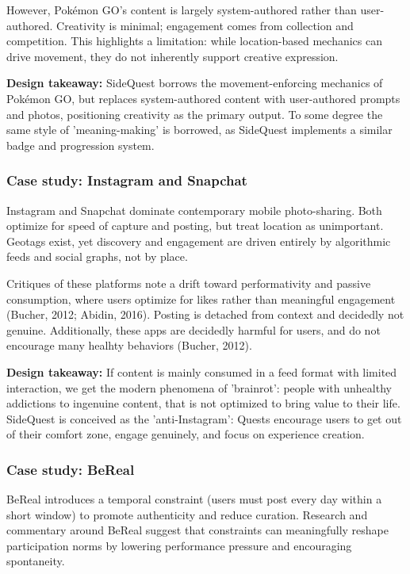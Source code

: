 \documentclass[12pt]{article}
\begin{document}
However, Pok\'emon GO's content is largely system-authored rather than user-authored. Creativity is minimal; engagement comes from collection and competition. This highlights a limitation: while location-based mechanics can drive movement, they do not inherently support creative expression.

\textbf{Design takeaway:} SideQuest borrows the movement-enforcing mechanics of Pok\'emon GO, but replaces system-authored content with user-authored prompts and photos, positioning creativity as the primary output. To some degree the same style of 'meaning-making' is borrowed, as SideQuest implements a similar badge and progression system.

\subsubsection*{Case study: Instagram and Snapchat}
Instagram and Snapchat dominate contemporary mobile photo-sharing. Both optimize for speed of capture and posting, but treat location as unimportant. Geotags exist, yet discovery and engagement are driven entirely by algorithmic feeds and social graphs, not by place.

Critiques of these platforms note a drift toward performativity and passive consumption, where users optimize for likes rather than meaningful engagement (Bucher, 2012; Abidin, 2016). Posting is detached from context and decidedly not genuine. Additionally, these apps are decidedly harmful for users, and do not encourage many healhty behaviors (Bucher, 2012).

\textbf{Design takeaway:} If content is mainly consumed in a feed format with limited interaction, we get the modern phenomena of 'brainrot': people with unhealthy addictions to ingenuine content, that is not optimized to bring value to their life. SideQuest is conceived as the 'anti-Instagram': Quests encourage users to get out of their comfort zone, engage genuinely, and focus on experience creation.

\subsubsection*{Case study: BeReal}
BeReal introduces a temporal constraint (users must post every day within a short window) to promote authenticity and reduce curation. Research and commentary around BeReal suggest that constraints can meaningfully reshape participation norms by lowering performance pressure and encouraging spontaneity.
\end{document}
